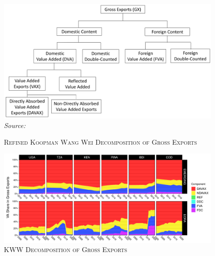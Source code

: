 \documentclass[a4paper]{article}
\begin{document}
\begin{figure}[h!] 
\centering
\caption{\label{fig:KWW}\textsc{Refined Koopman Wang Wei Decomposition of Gross Exports}}
\includegraphics[width=1\textwidth, trim= {0 0 0 0}, clip]{"Figures/KWW_DEC_NEW.png"} \raggedleft
\scriptsize
\emph{Source:} \citet{antras2022global}
\end{figure}
\FloatBarrier

\vspace{1cm}

\begin{figure}[h!]
\centering
\caption{\label{fig:KWW_fill_ts}\textsc{KWW Decomposition of Gross Exports}}
\includegraphics[width=1\textwidth]{"Figures/KWW_DEC_NEW.pdf"} \end{figure}
\FloatBarrier


\newpage
\end{document}
